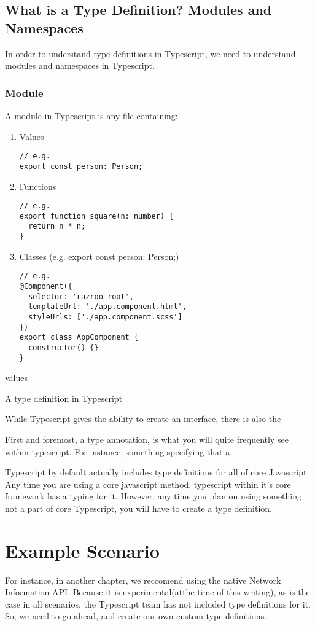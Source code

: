 \subsection{What is a Type Definition? Modules and Namespaces}
In order to understand type definitions in Typescript, we need to understand modules and namespaces in Typescript. 
\subsubsection{Module}
A module in Typescript is any file containing: 
\begin{enumerate}
  \item Values 
\begin{verbatim}
// e.g.  
export const person: Person;  
\end{verbatim}  
\item Functions
\begin{verbatim}
// e.g. 
export function square(n: number) {
  return n * n;
}  
\end{verbatim}
\item Classes (e.g. export const person: Person;)
\begin{verbatim}
// e.g.
@Component({
  selector: 'razroo-root',
  templateUrl: './app.component.html',
  styleUrls: ['./app.component.scss']
})
export class AppComponent {
  constructor() {}
}
\end{verbatim}
\end{enumerate}

values 



A type definition in Typescript 


While Typescript gives the ability to create an interface, there is also the

First and foremost, a type annotation, is what you will quite frequently see within typescript. For instance, something specifying that a 


Typescript by default actually includes type definitions for all of core
Javascript. Any time you are using a core javascript method, typescript
within it's core framework has a typing for it. However, any time you
plan on using something not a part of core Typescript, you will have to
create a type definition. 

\section{Example Scenario}
For instance, in another chapter, we reccomend using the native Network 
Information API. Because it is experimental(atthe time of this writing),
as is the case in all scenarios, the Typescript team has not included 
type definitions for it. So, we need to go ahead, and create our own 
custom type definitions. 

